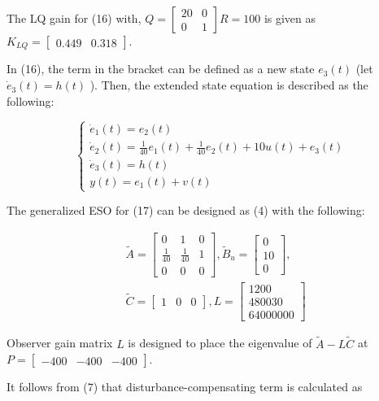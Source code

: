 \documentclass[10pt]{article}
\begin{document}
The LQ gain for (16) with, $Q=\left[\begin{array}{cc}20 & 0 \\ 0 & 1\end{array}\right] R=100$ is given as $K_{L Q}=\left[\begin{array}{ll}0.449 & 0.318\end{array}\right]$.

In (16), the term in the bracket can be defined as a new state $e_{3}(t)$ (let $\dot{e}_{3}(t)=h(t)$ ). Then, the extended state equation is described as the following:

$$
\left\{\begin{array}{c}
\dot{e}_{1}(t)=e_{2}(t) \\
\dot{e}_{2}(t)=\frac{1}{40} e_{1}(t)+\frac{1}{40} e_{2}(t)+10 u(t)+e_{3}(t) \\
\dot{e}_{3}(t)=h(t) \\
y(t)=e_{1}(t)+v(t)
\end{array}\right.
$$

The generalized ESO for (17) can be designed as (4) with the following:

$$
\begin{aligned}
& \tilde{A}=\left[\begin{array}{ccc}
0 & 1 & 0 \\
\frac{1}{40} & \frac{1}{40} & 1 \\
0 & 0 & 0
\end{array}\right], \tilde{B}_{u}=\left[\begin{array}{c}
0 \\
10 \\
0
\end{array}\right], \\
& \tilde{C}=\left[\begin{array}{lll}
1 & 0 & 0
\end{array}\right], L=\left[\begin{array}{c}
1200 \\
480030 \\
64000000
\end{array}\right]
\end{aligned}
$$

Observer gain matrix $L$ is designed to place the eigenvalue of $\tilde{A}-L \tilde{C}$ at $P=\left[\begin{array}{lll}-400 & -400 & -400\end{array}\right]$.

It follows from (7) that disturbance-compensating term is calculated as
\end{document}
